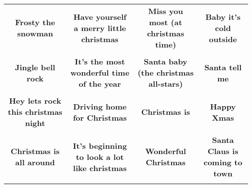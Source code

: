 \documentclass[12pt]{article} \usepackage{eso-pic, graphicx}
\newcommand{\background}[1]{%
\AddToShipoutPictureBG*{\texttt{[image: \#1]}}
}
\begin{document}
\tabcolsep=30.2pt \renewcommand{\arraystretch}{4.5}   \vspace*{4.3cm} \begin{center}  \begin{tabular}{c c c c}
\parbox{3cm}{\centering \textbf{Frosty the snowman}}& 
\parbox{3cm}{\centering \textbf{Have yourself a merry little christmas}}& 
\parbox{3cm}{\centering \textbf{Miss you most (at christmas time)}}& 
\parbox{3cm}{\centering \textbf{Baby it’s cold outside}}\\ \\ 
\parbox{3cm}{\centering \textbf{Jingle bell rock}}& 
\parbox{3cm}{\centering \textbf{It’s the most wonderful time of the year}}& 
\parbox{3cm}{\centering \textbf{Santa baby (the christmas all-stars)}}& 
\parbox{3cm}{\centering \textbf{Santa tell me}}\\ \\ 
\parbox{3cm}{\centering \textbf{Hey lets rock this christmas night}}& 
\parbox{3cm}{\centering \textbf{Driving home for Christmas}}& 
\parbox{3cm}{\centering \textbf{Christmas is}}& 
\parbox{3cm}{\centering \textbf{Happy Xmas}}\\ \\ 
\parbox{3cm}{\centering \textbf{Christmas is all around}}& 
\parbox{3cm}{\centering \textbf{It’s beginning to look a lot like christmas}}& 
\parbox{3cm}{\centering \textbf{Wonderful Christmas}}& 
\parbox{3cm}{\centering \textbf{Santa Claus is coming to town}}\\ \\ 
\end{tabular} \background{discobingo.pdf} \end{center} 
\end{document}
